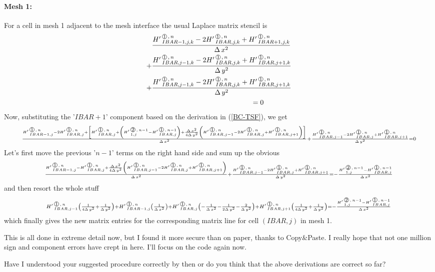 \paragraph{Mesh 1:} 
For a cell in mesh 1 adjacent to the mesh interface the usual Laplace matrix stencil is
\begin{align}   
    & \frac{ \HL{IBAR-1,j,k}{1}{n} -2 \HL{IBAR,j,k}{1}{n} + \HL{IBAR+1,j,k}{1}{n} }{\DXT} \\
+  & \frac{ \HL{IBAR,j-1,k}{1}{n} -2 \HL{IBAR,j,k}{1}{n} + \HL{IBAR,j+1,k}{1}{n} }{\DYT} \\
+  & \frac{ \HL{IBAR,j-1,k}{1}{n} -2 \HL{IBAR,j,k}{1}{n} + \HL{IBAR,j+1,k}{1}{n} }{\DYT} \\
& \hspace{5cm}= 0 
 \end{align}
Now, substituting the '$IBAR+1$' component based on the derivation in (\ref{BC-TSF}), we get 
\[ {\scriptstyle  \frac{ \HL{IBAR-1,j}{1}{n} -2 \HL{IBAR,j}{1}{n} 
+ \left[ \HL{IBAR,j}{1}{n}  + \left(\HL{1,j}{2}{n-1} - \HL{IBAR,j}{1}{n-1}\right) + \frac{\DXT}{4\DYT}   \left(\HL{IBAR,j-1}{1}{n} - 2 \HL{IBAR,j}{1}{n} + \HL{IBAR,j+1}{1}{n} \right) \right]}{\DXT}
+      \frac{ \HL{IBAR,j-1}{1}{n} -2 \HL{IBAR,j}{1}{n} + \HL{IBAR,j+1}{1}{n} }{\DYT} = 0}
\]
Let's first move the previous '${n-1}$' terms on the right hand side and sum up the obvious
\[ {\scriptstyle  \frac{ \HL{IBAR-1,j}{1}{n} - \HL{IBAR,j}{1}{n}   
+ \frac{\DXT}{4\DYT}   \left(\HL{IBAR,j-1}{1}{n} - 2 \HL{IBAR,j}{1}{n} + \HL{IBAR,j+1}{1}{n} \right) }{\DXT}
+      \frac{ \HL{IBAR,j-1}{1}{n} -2 \HL{IBAR,j}{1}{n} + \HL{IBAR,j+1}{1}{n} }{\DYT} = -\frac{\HL{1,j}{2}{n-1} - \HL{IBAR,j}{1}{n-1}}{\DXT} }
\]
and then resort the whole stuff
\[ {\scriptstyle 
      \HL{IBAR,j-1}{1}{n} \left( \frac {1}{4\DYT} + \frac {1}{\DYT}    \right)
 +   \HL{IBAR-1,j}{1}{n} \left( \frac {1}{\DXT} \right)
 +   \HL{IBAR,j}{1}{n} \left( -\frac {1}{\DXT} - \frac {1}{2\DYT} - \frac {2}{\DYT}    \right)
 +   \HL{IBAR,j+1}{1}{n} \left( \frac {1}{4\DYT}   + \frac {1}{\DYT}    \right)
    = -\frac{\HL{1,j}{2}{n-1} - \HL{IBAR,j}{1}{n-1}}{\DXT} }
\]
which finally gives the new matrix entries for the corresponding matrix line for cell $(IBAR,j)$ in mesh 1. 


This is all done in extreme detail now, but I found it more secure than on paper, thanks to Copy\&Paste. I really hope that not one million sign and component errors have crept in here. I'll focus on the code again now.

Have I understood your suggested procedure correctly by then or do you think that the above derivations are correct so far?

